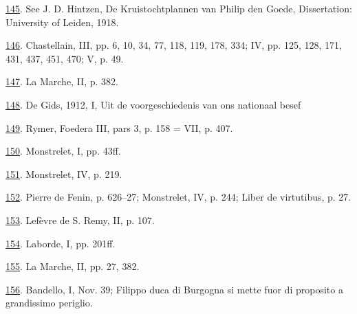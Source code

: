 \protect\hypertarget{23_NOTES.xhtmlux5cux23id_1646}{\protect\hyperlink{10_Chapter_Three__THE_HEROIC_DREAM.xhtmlux5cux23id_1645}{145}}.
See J. D. Hintzen, De Kruistochtplannen van Philip den Goede,
Dissertation: University of Leiden, 1918.

\protect\hypertarget{23_NOTES.xhtmlux5cux23id_1644}{\protect\hyperlink{10_Chapter_Three__THE_HEROIC_DREAM.xhtmlux5cux23id_1643}{146}}.
Chastellain, III, pp. 6, 10, 34, 77, 118, 119, 178, 334; IV, pp. 125,
128, 171, 431, 437, 451, 470; V, p. 49.

\protect\hypertarget{23_NOTES.xhtmlux5cux23id_1642}{\protect\hyperlink{10_Chapter_Three__THE_HEROIC_DREAM.xhtmlux5cux23id_1641}{147}}.
La Marche, II, p. 382.

\protect\hypertarget{23_NOTES.xhtmlux5cux23id_1640}{\protect\hyperlink{10_Chapter_Three__THE_HEROIC_DREAM.xhtmlux5cux23id_1639}{148}}.
De Gids, 1912, I, Uit de voorgeschiedenis van ons nationaal besef

\protect\hypertarget{23_NOTES.xhtmlux5cux23id_1638}{\protect\hyperlink{10_Chapter_Three__THE_HEROIC_DREAM.xhtmlux5cux23id_1637}{149}}.
Rymer, Foedera III, pars 3, p. 158 = VII, p. 407.

\protect\hypertarget{23_NOTES.xhtmlux5cux23id_1636}{\protect\hyperlink{10_Chapter_Three__THE_HEROIC_DREAM.xhtmlux5cux23id_1635}{150}}.
Monstrelet, I, pp. 43ff.

\protect\hypertarget{23_NOTES.xhtmlux5cux23id_1634}{\protect\hyperlink{10_Chapter_Three__THE_HEROIC_DREAM.xhtmlux5cux23id_1633}{151}}.
Monstrelet, IV, p. 219.

\protect\hypertarget{23_NOTES.xhtmlux5cux23id_1632}{\protect\hyperlink{10_Chapter_Three__THE_HEROIC_DREAM.xhtmlux5cux23id_1631}{152}}.
Pierre de Fenin, p. 626--27; Monstrelet, IV, p. 244; Liber de
virtutibus, p. 27.

\protect\hypertarget{23_NOTES.xhtmlux5cux23id_1630}{\protect\hyperlink{10_Chapter_Three__THE_HEROIC_DREAM.xhtmlux5cux23id_1629}{153}}.
Lefèvre de S. Remy, II, p. 107.

\protect\hypertarget{23_NOTES.xhtmlux5cux23id_1628}{\protect\hyperlink{10_Chapter_Three__THE_HEROIC_DREAM.xhtmlux5cux23id_1627}{154}}.
Laborde, I, pp. 201ff.

\protect\hypertarget{23_NOTES.xhtmlux5cux23page_410}{\protect\hyperlink{10_Chapter_Three__THE_HEROIC_DREAM.xhtmlux5cux23id_1626}{155}}.
La Marche, II, pp. 27, 382.

\protect\hypertarget{23_NOTES.xhtmlux5cux23id_1625}{\protect\hyperlink{10_Chapter_Three__THE_HEROIC_DREAM.xhtmlux5cux23id_1624}{156}}.
Bandello, I, Nov. 39; Filippo duca di Burgogna si mette fuor di
proposito a grandissimo periglio.


